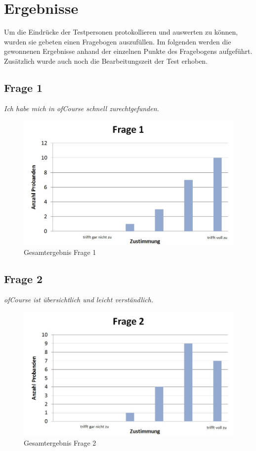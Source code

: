 \section{Ergebnisse}
Um die Eindrücke der Testpersonen protokollieren und auswerten zu können, wurden sie gebeten einen Fragebogen auszufüllen.
Im folgenden werden die gewonnenen Ergebnisse anhand der einzelnen Punkte des Fragebogens aufgeführt. Zusätzlich
wurde auch noch die Bearbeitungszeit der Test erhoben.

\subsection{Frage 1}
\begin{center}
	{\it Ich habe mich in ofCourse schnell zurechtgefunden.}
\end{center}
\begin{figure}[h]
\centering
\includegraphics[width=0.7\linewidth]{img/Frage1}
\caption{Gesamtergebnis Frage 1}
\label{fig:Frage1}
\end{figure}

\subsection{Frage 2}
\begin{center}
	{\it ofCourse ist übersichtlich und leicht verständlich.}
\end{center}
\begin{figure}[h]
\centering
\includegraphics[width=0.7\linewidth]{img/Frage2}
\caption{Gesamtergebnis Frage 2}
\label{fig:Frage2}
\end{figure}


